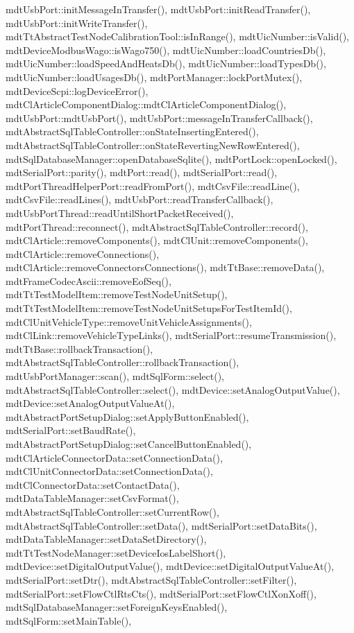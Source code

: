 mdt\-Usb\-Port\-::init\-Message\-In\-Transfer(), mdt\-Usb\-Port\-::init\-Read\-Transfer(), mdt\-Usb\-Port\-::init\-Write\-Transfer(), mdt\-Tt\-Abstract\-Test\-Node\-Calibration\-Tool\-::is\-In\-Range(), mdt\-Uic\-Number\-::is\-Valid(), mdt\-Device\-Modbus\-Wago\-::is\-Wago750(), mdt\-Uic\-Number\-::load\-Countries\-Db(), mdt\-Uic\-Number\-::load\-Speed\-And\-Heats\-Db(), mdt\-Uic\-Number\-::load\-Types\-Db(), mdt\-Uic\-Number\-::load\-Usages\-Db(), mdt\-Port\-Manager\-::lock\-Port\-Mutex(), mdt\-Device\-Scpi\-::log\-Device\-Error(), mdt\-Cl\-Article\-Component\-Dialog\-::mdt\-Cl\-Article\-Component\-Dialog(), mdt\-Usb\-Port\-::mdt\-Usb\-Port(), mdt\-Usb\-Port\-::message\-In\-Transfer\-Callback(), mdt\-Abstract\-Sql\-Table\-Controller\-::on\-State\-Inserting\-Entered(), mdt\-Abstract\-Sql\-Table\-Controller\-::on\-State\-Reverting\-New\-Row\-Entered(), mdt\-Sql\-Database\-Manager\-::open\-Database\-Sqlite(), mdt\-Port\-Lock\-::open\-Locked(), mdt\-Serial\-Port\-::parity(), mdt\-Port\-::read(), mdt\-Serial\-Port\-::read(), mdt\-Port\-Thread\-Helper\-Port\-::read\-From\-Port(), mdt\-Csv\-File\-::read\-Line(), mdt\-Csv\-File\-::read\-Lines(), mdt\-Usb\-Port\-::read\-Transfer\-Callback(), mdt\-Usb\-Port\-Thread\-::read\-Until\-Short\-Packet\-Received(), mdt\-Port\-Thread\-::reconnect(), mdt\-Abstract\-Sql\-Table\-Controller\-::record(), mdt\-Cl\-Article\-::remove\-Components(), mdt\-Cl\-Unit\-::remove\-Components(), mdt\-Cl\-Article\-::remove\-Connections(), mdt\-Cl\-Article\-::remove\-Connectors\-Connections(), mdt\-Tt\-Base\-::remove\-Data(), mdt\-Frame\-Codec\-Ascii\-::remove\-Eof\-Seq(), mdt\-Tt\-Test\-Model\-Item\-::remove\-Test\-Node\-Unit\-Setup(), mdt\-Tt\-Test\-Model\-Item\-::remove\-Test\-Node\-Unit\-Setups\-For\-Test\-Item\-Id(), mdt\-Cl\-Unit\-Vehicle\-Type\-::remove\-Unit\-Vehicle\-Assignments(), mdt\-Cl\-Link\-::remove\-Vehicle\-Type\-Links(), mdt\-Serial\-Port\-::resume\-Transmission(), mdt\-Tt\-Base\-::rollback\-Transaction(), mdt\-Abstract\-Sql\-Table\-Controller\-::rollback\-Transaction(), mdt\-Usb\-Port\-Manager\-::scan(), mdt\-Sql\-Form\-::select(), mdt\-Abstract\-Sql\-Table\-Controller\-::select(), mdt\-Device\-::set\-Analog\-Output\-Value(), mdt\-Device\-::set\-Analog\-Output\-Value\-At(), mdt\-Abstract\-Port\-Setup\-Dialog\-::set\-Apply\-Button\-Enabled(), mdt\-Serial\-Port\-::set\-Baud\-Rate(), mdt\-Abstract\-Port\-Setup\-Dialog\-::set\-Cancel\-Button\-Enabled(), mdt\-Cl\-Article\-Connector\-Data\-::set\-Connection\-Data(), mdt\-Cl\-Unit\-Connector\-Data\-::set\-Connection\-Data(), mdt\-Cl\-Connector\-Data\-::set\-Contact\-Data(), mdt\-Data\-Table\-Manager\-::set\-Csv\-Format(), mdt\-Abstract\-Sql\-Table\-Controller\-::set\-Current\-Row(), mdt\-Abstract\-Sql\-Table\-Controller\-::set\-Data(), mdt\-Serial\-Port\-::set\-Data\-Bits(), mdt\-Data\-Table\-Manager\-::set\-Data\-Set\-Directory(), mdt\-Tt\-Test\-Node\-Manager\-::set\-Device\-Ios\-Label\-Short(), mdt\-Device\-::set\-Digital\-Output\-Value(), mdt\-Device\-::set\-Digital\-Output\-Value\-At(), mdt\-Serial\-Port\-::set\-Dtr(), mdt\-Abstract\-Sql\-Table\-Controller\-::set\-Filter(), mdt\-Serial\-Port\-::set\-Flow\-Ctl\-Rts\-Cts(), mdt\-Serial\-Port\-::set\-Flow\-Ctl\-Xon\-Xoff(), mdt\-Sql\-Database\-Manager\-::set\-Foreign\-Keys\-Enabled(), mdt\-Sql\-Form\-::set\-Main\-Table(), 